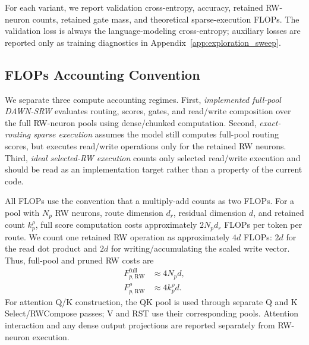 \documentclass{article}
\begin{document}
For each variant, we report validation cross-entropy, accuracy, retained RW-neuron counts, retained gate mass, and theoretical sparse-execution FLOPs. The validation loss is always the language-modeling cross-entropy; auxiliary losses are reported only as training diagnostics in Appendix~\ref{app:exploration_sweep}.

\subsection{FLOPs Accounting Convention}

We separate three compute accounting regimes. First, \emph{implemented full-pool DAWN-SRW} evaluates routing, scores, gates, and read/write composition over the full RW-neuron pools using dense/chunked computation. Second, \emph{exact-routing sparse execution} assumes the model still computes full-pool routing scores, but executes read/write operations only for the retained RW neurons. Third, \emph{ideal selected-RW execution} counts only selected read/write execution and should be read as an implementation target rather than a property of the current code.

All FLOPs use the convention that a multiply-add counts as two FLOPs. For a pool with $N_p$ RW neurons, route dimension $d_r$, residual dimension $d$, and retained count $k_p^\rho$, full score computation costs approximately $2N_p d_r$ FLOPs per token per route. We count one retained RW operation as approximately $4d$ FLOPs: $2d$ for the read dot product and $2d$ for writing/accumulating the scaled write vector. Thus, full-pool and pruned RW costs are
\begin{align}
    F_{p,\mathrm{RW}}^{\mathrm{full}} &\approx 4N_p d, \\
    F_{p,\mathrm{RW}}^{\rho} &\approx 4k_p^\rho d .
\end{align}
For attention Q/K construction, the QK pool is used through separate Q and K Select/RWCompose passes; V and RST use their corresponding pools. Attention interaction and any dense output projections are reported separately from RW-neuron execution.
\end{document}
